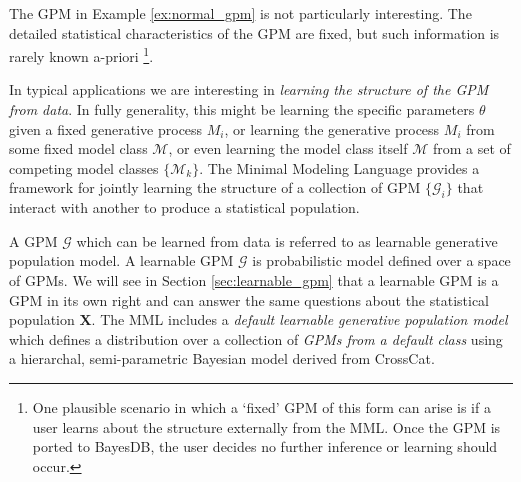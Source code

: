 \documentclass[10pt,letterpaper]{article}
\newcommand{\set}[1]{\{#1\}}
\begin{document}
The GPM in Example \ref{ex:normal_gpm} is not particularly interesting. The
detailed statistical characteristics of the GPM are fixed, but such information
is rarely known a-priori
\footnote{One plausible
scenario in which a `fixed' GPM of this form can arise is if a user learns about
the structure externally from the MML. Once the GPM is ported to BayesDB, the
user decides no further inference or learning should occur.}.

In typical applications we are interesting in \textit{learning the structure of
the GPM from data}. In fully generality, this might be learning the specific
parameters $\theta$ given a fixed generative process $M_i$, or learning the
generative process $M_i$ from some fixed model class $\mathcal{M}$, or even
learning the model class itself $\mathcal{M}$ from a set of competing model
classes $\set{\mathcal{M}_k}$. The Minimal Modeling Language provides a
framework for jointly learning the structure of a collection of GPM
$\set{\mathcal{G}_i}$ that interact with another to produce a statistical
population.

A GPM $\mathcal{G}$ which can be learned from data is referred to as learnable
generative population model. A learnable GPM $\mathcal{G}$ is probabilistic
model defined over a space of GPMs. We will see in Section
\ref{sec:learnable_gpm} that a learnable GPM is a GPM in its own right and can
answer the same questions about the statistical population $\mathbf{X}$. The MML
includes a
\textit{default learnable generative population model} which defines a
distribution over a collection of
\textit{GPMs from a default class} using a hierarchal, semi-parametric Bayesian
model derived from CrossCat.
\end{document}
